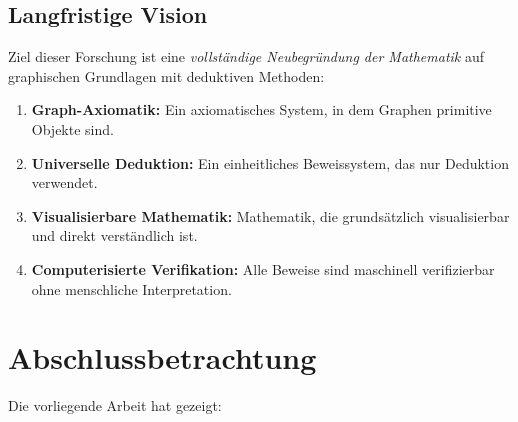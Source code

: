 \documentclass[12pt, a4paper]{article}
\theoremstyle{definition}
\theoremstyle{remark}
\begin{document}
\subsection{Langfristige Vision}
\label{subsec:langfristige_vision}

Ziel dieser Forschung ist eine \emph{vollständige Neubegründung der Mathematik} auf graphischen Grundlagen mit deduktiven Methoden:

\begin{enumerate}[label=(\roman*)]
  \item \textbf{Graph-Axiomatik:} Ein axiomatisches System, in dem Graphen primitive Objekte sind.
  
  \item \textbf{Universelle Deduktion:} Ein einheitliches Beweissystem, das nur Deduktion verwendet.
  
  \item \textbf{Visualisierbare Mathematik:} Mathematik, die grundsätzlich visualisierbar und direkt verständlich ist.
  
  \item \textbf{Computerisierte Verifikation:} Alle Beweise sind maschinell verifizierbar ohne menschliche Interpretation.
\end{enumerate}

\section{Abschlussbetrachtung}
\label{sec:abschluss}

Die vorliegende Arbeit hat gezeigt:
\end{document}
